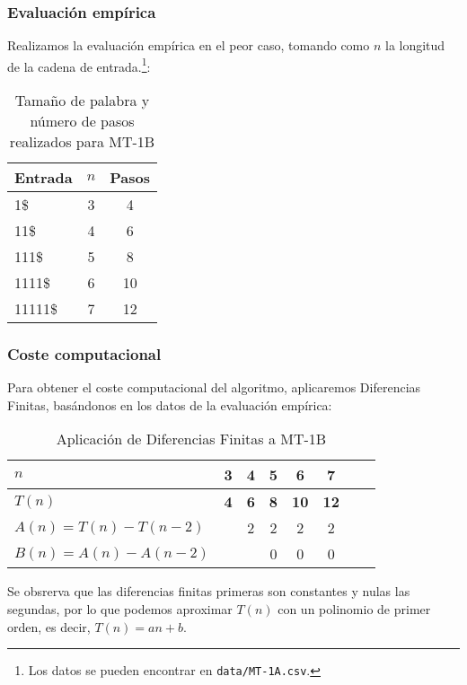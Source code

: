 \subsubsection*{Evaluación empírica}
Realizamos la evaluación empírica en el peor caso, tomando como $n$ la longitud de la cadena de entrada.\footnote{Los datos se pueden encontrar en \texttt{data/MT-1A.csv}.}:

\begin{table}[h]
    \centering
    \begin{tabular}{lcc}
        Entrada                    & $n$ & Pasos \\
        \hline
        1\$                       & 3  &  4  \\
        11\$                      & 4  &  6  \\
        111\$                     & 5  &  8  \\
        1111\$                    & 6  &  10  \\
        11111\$                   & 7  &  12  \\
    \end{tabular}
    \caption{Tamaño de palabra y número de pasos realizados para MT-1B}
\end{table}


\subsubsection*{Coste computacional}
Para obtener el coste computacional del algoritmo, aplicaremos Diferencias Finitas, basándonos en los datos de la evaluación empírica:

\begin{table}[h]
    \centering
    \begin{tabular}{|l|c|c|c|c|c|c|c|}
        \hline
        $n$ & \textbf{3} & \textbf{4} & \textbf{5} & \textbf{6} & \textbf{7}\\ \hline
        $T(n)$ & \textbf{4} & \textbf{6} & \textbf{8} & \textbf{10} & \textbf{12}      \\ \hline
        \hline
        $A(n) = T(n) - T(n-2)$ &    & 2 & 2 & 2 & 2 \\ \hline
        $B(n) = A(n) - A(n-2)$ &    &   & 0 & 0 & 0 \\ \hline
    \end{tabular}
    \caption{Aplicación de Diferencias Finitas a MT-1B}
\end{table}

Se obsrerva que las diferencias finitas primeras son constantes y nulas las segundas, por lo que podemos aproximar $T(n)$ con un polinomio de primer orden, es decir, $T(n) = an + b$.\medskip

